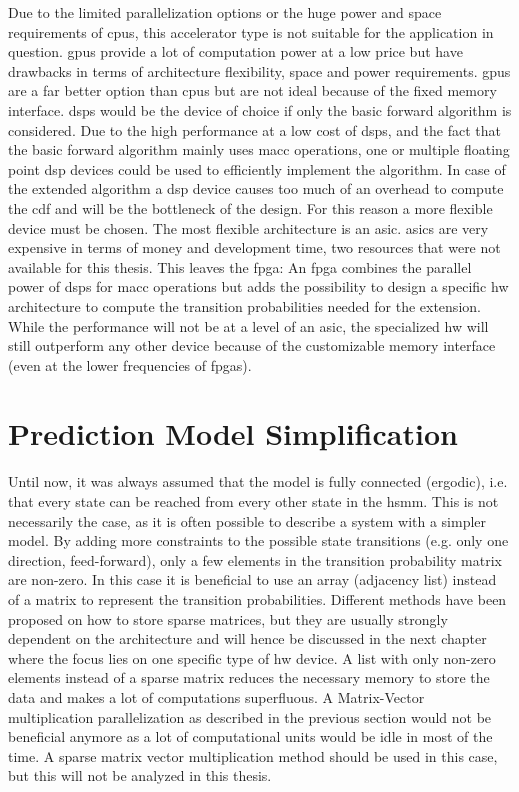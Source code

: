 \documentclass[mscthesis]{usiinfthesis}
\begin{document}
Due to the limited parallelization options or the huge power and space
requirements of \glspl{cpu}, this accelerator type is not suitable for the
application in question. \glspl{gpu} provide a lot of computation power at
a low price but have drawbacks in terms of architecture flexibility, space and
power requirements. \glspl{gpu} are a far better option than \glspl{cpu} but
are not ideal because of the fixed memory interface. \glspl{dsp} would be the
device of choice if only the basic forward algorithm is considered. Due to the
high performance at a low cost of \glspl{dsp}, and the fact that the basic
forward algorithm mainly uses \gls{macc} operations, one or multiple floating
point \gls{dsp} devices could be used to efficiently implement the algorithm.
In case of the extended algorithm a \gls{dsp} device causes too much of an
overhead to compute the \gls{cdf} and will be the bottleneck of the design. For
this reason a more flexible device must be chosen. The most flexible
architecture is an \gls{asic}. \glspl{asic} are very expensive in terms of
money and development time, two resources that were not available for this
thesis. This leaves the \gls{fpga}: An \gls{fpga} combines the parallel power
of \glspl{dsp} for \gls{macc} operations but adds the possibility to design
a specific \gls{hw} architecture to compute the transition probabilities needed
for the extension. While the performance will not be at a level of an
\gls{asic}, the specialized \gls{hw} will still outperform any other device
because of the customizable memory interface (even at the lower frequencies of
\glspl{fpga}).

\section{Prediction Model Simplification}
\label{ch:analysis_simple}

Until now, it was always assumed that the model is fully connected (ergodic),
i.e. that every state can be reached from every other state in the \gls{hsmm}.
This is not necessarily the case, as it is often possible to describe a system
with a simpler model. By adding more constraints to the possible state
transitions (e.g. only one direction, feed-forward), only a few elements in the
transition probability matrix are non-zero. In this case it is beneficial to
use an array (adjacency list) instead of a matrix to represent the transition
probabilities. Different methods have been proposed on how to store sparse
matrices, but they are usually strongly dependent on the architecture and will
hence be discussed in the next chapter where the focus lies on one specific
type of \gls{hw} device. A list with only non-zero elements instead of a sparse
matrix reduces the necessary memory to store the data and makes a lot of
computations superfluous. A Matrix-Vector multiplication parallelization as
described in the previous section would not be beneficial anymore as a lot of
computational units would be idle in most of the time. A sparse matrix vector
multiplication method should be used in this case, but this will not be
analyzed in this thesis.
\end{document}
